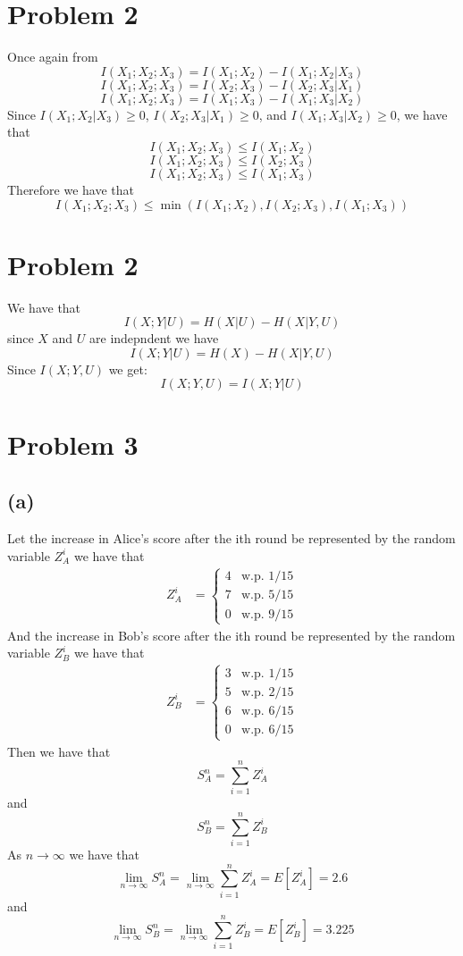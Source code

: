 \section*{Problem 2}
Once again from 
$$I(X_1;X_2;X_3)=I(X_1;X_2)-I(X_1;X_2|X_3)$$
$$I(X_1;X_2;X_3)=I(X_2;X_3)-I(X_2;X_3|X_1)$$
$$I(X_1;X_2;X_3)=I(X_1;X_3)-I(X_1;X_3|X_2)$$
Since $I(X_1;X_2|X_3)\geq0$, $I(X_2;X_3|X_1)\geq0$, and $I(X_1;X_3|X_2)\geq0$, we have that
$$I(X_1;X_2;X_3)\leq I(X_1;X_2)$$
$$I(X_1;X_2;X_3)\leq I(X_2;X_3)$$
$$I(X_1;X_2;X_3)\leq I(X_1;X_3)$$
Therefore we have that
$$I(X_1;X_2;X_3)\leq\min(I(X_1;X_2),I(X_2;X_3),I(X_1;X_3))$$
\section*{Problem 2}
We have that 
$$I(X;Y|U)=H(X|U)-H(X|Y,U)$$
since $X$ and $U$ are indepndent we have
$$I(X;Y|U)=H(X)-H(X|Y,U)$$
Since $I(X;Y,U)$ we get:
$$I(X;Y,U)=I(X;Y|U)$$

\section*{Problem 3}
\subsection*{(a)}
Let the increase in Alice's score after the ith round be 
represented by the random variable $Z_A^i$ we have that
\begin{align*}
    Z_A^i&=\begin{cases}
        4 & \text{w.p. } 1/15\\
        7 & \text{w.p. } 5/15\\
        0 & \text{w.p. } 9/15
    \end{cases}
\end{align*}
And the increase in Bob's score after the ith round be
represented by the random variable $Z_B^i$ we have that
\begin{align*}
    Z_B^i&=\begin{cases}
        3 & \text{w.p. } 1/15\\
        5 & \text{w.p. } 2/15\\
        6 & \text{w.p. } 6/15\\
        0 & \text{w.p. } 6/15
    \end{cases}
\end{align*}
Then we have that 
$$S_A^n=\sum_{i=1}^n Z_A^i$$
and
$$S_B^n=\sum_{i=1}^n Z_B^i$$
As $n\to\infty$ we have that
$$\lim_{n\to\infty}S_A^n=\lim_{n\to\infty}\sum_{i=1}^n Z_A^i=E[Z_A^i]=\boxed{2.6}$$
and
$$\lim_{n\to\infty}S_B^n=\lim_{n\to\infty}\sum_{i=1}^n Z_B^i=E[Z_B^i]=\boxed{3.225}$$
